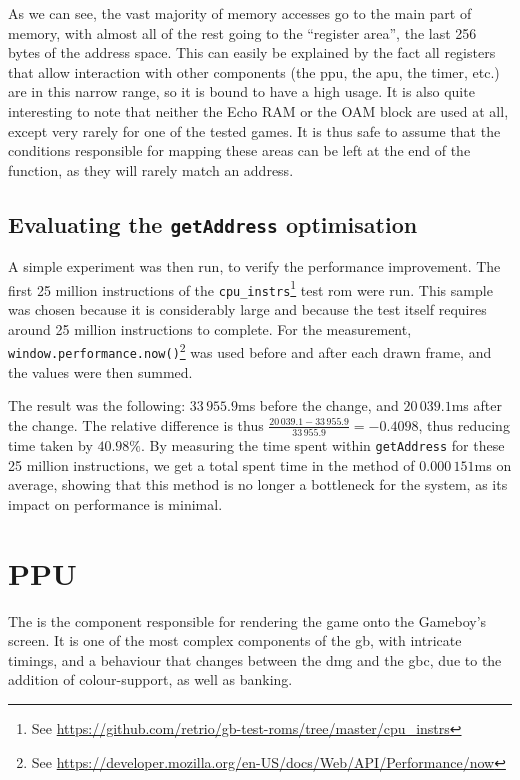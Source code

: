 \documentclass[11pt]{informatics-report}
\newcommand{\ftnt}[1]{\footnote{See \url{#1}}}
\begin{document}
As we can see, the vast majority of memory accesses go to the main part of memory, with almost all of the rest going to the ``register area'', the last 256 bytes of the address space. This can easily be explained by the fact all registers that allow interaction with other components (the \gls{ppu}, the \gls{apu}, the timer, etc.) are in this narrow range, so it is bound to have a high usage. It is also quite interesting to note that neither the Echo RAM or the OAM block are used at all, except very rarely for one of the tested games. It is thus safe to assume that the conditions responsible for mapping these areas can be left at the end of the function, as they will rarely match an address.

\subsection{Evaluating the \texttt{getAddress} optimisation}

A simple experiment was then run, to verify the performance improvement. The first 25 million instructions of the \texttt{cpu\_instrs}\ftnt{https://github.com/retrio/gb-test-roms/tree/master/cpu_instrs} test \gls{rom} were run. This sample was chosen because it is considerably large and because the test itself requires around 25 million instructions to complete. For the measurement, \texttt{window.performance.now()}\ftnt{https://developer.mozilla.org/en-US/docs/Web/API/Performance/now} was used before and after each drawn frame, and the values were then summed.

The result was the following: $33\,955.9$ms before the change, and $20\,039.1$ms after the change. The relative difference is thus $\frac{20\,039.1-33\,955.9}{33\,955.9}=-0.4098$, thus reducing time taken by $40.98\%$. By measuring the time spent within \texttt{getAddress} for these 25 million instructions, we get a total spent time in the method of $0.000\,151$ms on average, showing that this method is no longer a bottleneck for the system, as its impact on performance is minimal.

\section{PPU}

The  is the component responsible for rendering the game onto the Gameboy's screen. It is one of the most complex components of the \gls{gb}, with intricate timings, and a behaviour that changes between the \gls{dmg} and the \gls{gbc}, due to the addition of colour-support, as well as  banking.
\end{document}
